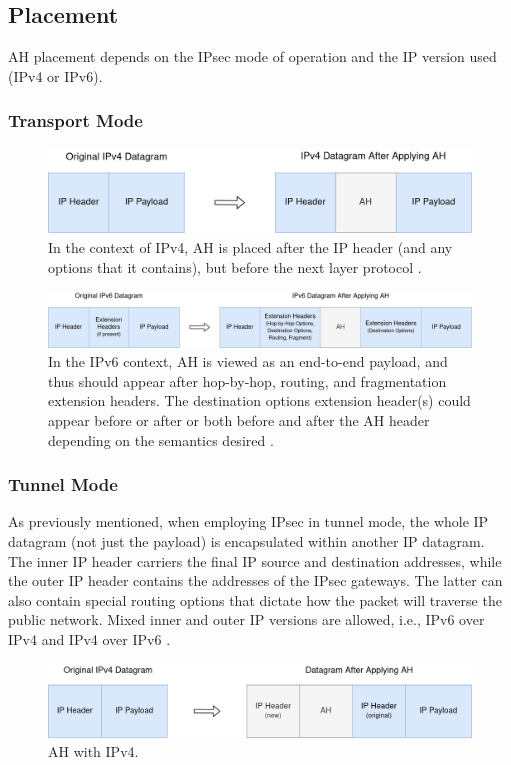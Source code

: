 \documentclass[a4paper,12pt]{report}
\begin{document}
		\subsection{Placement}
		AH placement depends on the IPsec mode of operation and the IP version used (IPv4 or IPv6).
		\subsubsection{Transport Mode}
		\begin{figure}[h]
			\includegraphics[width=\textwidth]{ah_transport_ipv4}
			\centering
			\caption{In the context of IPv4, AH is placed after the IP header (and any options that it contains), but before the next layer protocol \cite{rfc4302}.}
		\end{figure}
		
		\begin{figure}[h]
			\includegraphics[width=\textwidth]{ah_transport_ipv6}
			\centering
			\caption{In the IPv6 context, AH is viewed as an end-to-end payload, and thus should appear after hop-by-hop, routing, and fragmentation extension headers.  The destination options extension header(s) could appear before or after or both before and after the AH header depending on the semantics desired \cite{rfc4302}.}
		\end{figure}
		
		\subsubsection{Tunnel Mode}
		As previously mentioned, when employing IPsec in tunnel mode, the whole IP datagram (not just the payload) is encapsulated within another IP datagram. The inner IP header carriers the final IP source and destination addresses, while the outer IP header contains the addresses of the IPsec gateways. The latter can also contain special routing options that dictate how the packet will traverse the public network. Mixed inner and outer IP versions are allowed, i.e., IPv6 over IPv4 and IPv4 over IPv6 \cite{rfc4302}.
		\begin{figure}[h]
			\includegraphics[width=\textwidth]{ah_tunnel_ipv4}
			\centering
			\caption{AH with IPv4.}
		\end{figure}
		
\end{document}
